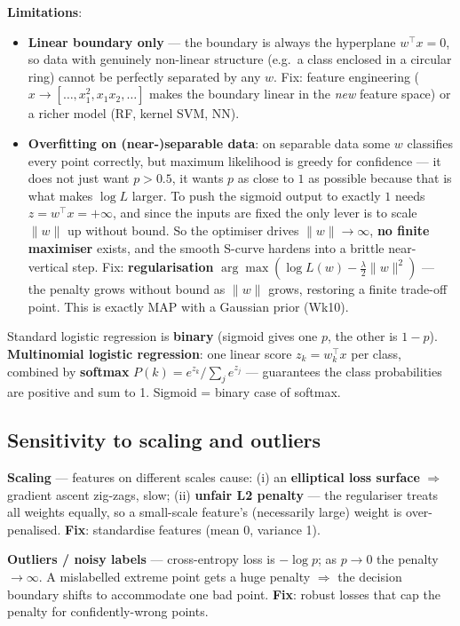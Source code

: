 \documentclass[11pt, a4paper]{article}
\newcommand{\kw}[1]{\textbf{#1}}
\begin{document}
\kw{Limitations}:
\begin{itemize}
  \item \kw{Linear boundary only} — the boundary is always the hyperplane $w^\top x=0$, so data with
  genuinely non-linear structure (e.g.\ a class enclosed in a circular ring) cannot be perfectly
  separated by any $w$. Fix: feature engineering ($x\to[\dots,x_1^2,x_1x_2,\dots]$ makes the
  boundary linear in the \emph{new} feature space) or a richer model (RF, kernel SVM, NN).
  \item \kw{Overfitting on (near-)separable data}: on separable data some $w$ classifies every
  point correctly, but maximum likelihood is greedy for confidence — it does not just want
  $p>0.5$, it wants $p$ as close to $1$ as possible because that is what makes $\log L$ larger. To
  push the sigmoid output to exactly $1$ needs $z=w^\top x=+\infty$, and since the inputs are fixed
  the only lever is to scale $\|w\|$ up without bound. So the optimiser drives $\|w\|\to\infty$,
  \kw{no finite maximiser} exists, and the smooth S-curve hardens into a brittle near-vertical step.
  Fix: \kw{regularisation} $\arg\max(\log L(w)-\tfrac\lambda2\|w\|^2)$ — the penalty grows without
  bound as $\|w\|$ grows, restoring a finite trade-off point. This is exactly MAP with a Gaussian
  prior (Wk10).
\end{itemize}

\begin{trapbox}
Standard logistic regression is \kw{binary} (sigmoid gives one $p$, the other is $1-p$).
\kw{Multinomial logistic regression}: one linear score $z_k=w_k^\top x$ per class, combined by
\kw{softmax} $P(k)=e^{z_k}/\sum_j e^{z_j}$ — guarantees the class probabilities are positive and sum
to 1. Sigmoid = binary case of softmax.
\end{trapbox}

\subsection{Sensitivity to scaling and outliers}

\kw{Scaling} — features on different scales cause: (i) an \kw{elliptical loss surface}
$\Rightarrow$ gradient ascent zig-zags, slow; (ii) \kw{unfair L2 penalty} — the regulariser treats
all weights equally, so a small-scale feature's (necessarily large) weight is over-penalised.
\kw{Fix}: standardise features (mean 0, variance 1).

\kw{Outliers / noisy labels} — cross-entropy loss is $-\log p$; as $p\to0$ the penalty $\to\infty$.
A mislabelled extreme point gets a huge penalty $\Rightarrow$ the decision boundary shifts to
accommodate one bad point. \kw{Fix}: robust losses that cap the penalty for confidently-wrong points.
\end{document}
